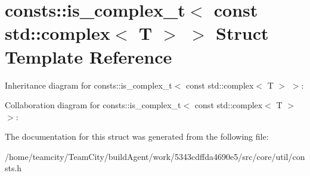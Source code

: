 \hypertarget{structconsts_1_1is__complex__t_3_01const_01std_1_1complex_3_01T_01_4_01_4}{}\section{consts\+:\+:is\+\_\+complex\+\_\+t$<$ const std\+:\+:complex$<$ T $>$ $>$ Struct Template Reference}
\label{structconsts_1_1is__complex__t_3_01const_01std_1_1complex_3_01T_01_4_01_4}


Inheritance diagram for consts\+:\+:is\+\_\+complex\+\_\+t$<$ const std\+:\+:complex$<$ T $>$ $>$\+:


Collaboration diagram for consts\+:\+:is\+\_\+complex\+\_\+t$<$ const std\+:\+:complex$<$ T $>$ $>$\+:


The documentation for this struct was generated from the following file\+:\begin{DoxyCompactItemize}
\item 
/home/teamcity/\+Team\+City/build\+Agent/work/5343cdffda4690e5/src/core/util/consts.\+h\end{DoxyCompactItemize}
